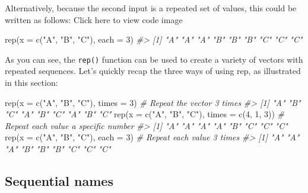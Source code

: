 \documentclass[
]{book}
\newenvironment{Shaded}{\begin{snugshade}}{\end{snugshade}}
\newcommand{\AttributeTok}[1]{\textcolor[rgb]{0.77,0.63,0.00}{#1}}
\newcommand{\CommentTok}[1]{\textcolor[rgb]{0.56,0.35,0.01}{\textit{#1}}}
\newcommand{\DecValTok}[1]{\textcolor[rgb]{0.00,0.00,0.81}{#1}}
\newcommand{\FunctionTok}[1]{\textcolor[rgb]{0.00,0.00,0.00}{#1}}
\newcommand{\NormalTok}[1]{#1}
\newcommand{\StringTok}[1]{\textcolor[rgb]{0.31,0.60,0.02}{#1}}
\begin{document}
Alternatively, because the second input is a repeated set of values, this could be written as follows:
Click here to view code image

\begin{Shaded}
\begin{Highlighting}[]
\FunctionTok{rep}\NormalTok{(}\AttributeTok{x =} \FunctionTok{c}\NormalTok{(}\StringTok{"A"}\NormalTok{, }\StringTok{"B"}\NormalTok{, }\StringTok{"C"}\NormalTok{), }\AttributeTok{each =} \DecValTok{3}\NormalTok{)}
\CommentTok{\#\textgreater{} [1] "A" "A" "A" "B" "B" "B" "C" "C" "C"}
\end{Highlighting}
\end{Shaded}

As you can see, the \texttt{rep()} function can be used to create a variety of vectors with repeated sequences. Let's quickly recap the three ways of using rep, as illustrated in this section:

\begin{Shaded}
\begin{Highlighting}[]
\FunctionTok{rep}\NormalTok{(}\AttributeTok{x =} \FunctionTok{c}\NormalTok{(}\StringTok{"A"}\NormalTok{, }\StringTok{"B"}\NormalTok{, }\StringTok{"C"}\NormalTok{), }\AttributeTok{times =} \DecValTok{3}\NormalTok{)          }\CommentTok{\# Repeat the vector 3 times}
\CommentTok{\#\textgreater{} [1] "A" "B" "C" "A" "B" "C" "A" "B" "C"}
\FunctionTok{rep}\NormalTok{(}\AttributeTok{x =} \FunctionTok{c}\NormalTok{(}\StringTok{"A"}\NormalTok{, }\StringTok{"B"}\NormalTok{, }\StringTok{"C"}\NormalTok{), }\AttributeTok{times =} \FunctionTok{c}\NormalTok{(}\DecValTok{4}\NormalTok{, }\DecValTok{1}\NormalTok{, }\DecValTok{3}\NormalTok{)) }\CommentTok{\# Repeat each value a specific number}
\CommentTok{\#\textgreater{} [1] "A" "A" "A" "A" "B" "C" "C" "C"}
\FunctionTok{rep}\NormalTok{(}\AttributeTok{x =} \FunctionTok{c}\NormalTok{(}\StringTok{"A"}\NormalTok{, }\StringTok{"B"}\NormalTok{, }\StringTok{"C"}\NormalTok{), }\AttributeTok{each =} \DecValTok{3}\NormalTok{)           }\CommentTok{\# Repeat each value 3 times}
\CommentTok{\#\textgreater{} [1] "A" "A" "A" "B" "B" "B" "C" "C" "C"}
\end{Highlighting}
\end{Shaded}

\hypertarget{sequential-names}{%
\subsection{Sequential names}\label{sequential-names}}
\end{document}
